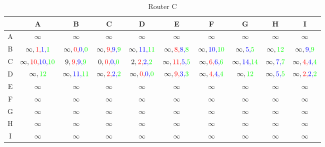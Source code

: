 \documentclass[a4paper,10pt]{article}
\begin{document}
\begin{table}[H]
\centering
\begin{tabular}{|c|c|c|c|c|c|c|c|c|c|} \hline
 & A & B & C & D & E & F & G & H & I  \\\hline
A & $ \infty $ & $\infty $ & $\infty $ & $\infty $ & $\infty $ & $\infty $ & $\infty $ & $ \infty$ & $\infty $ \\\hline
B & $\infty,{\color{red}1,}{\color{blue}1,}{\color{green}1}$ & $\infty,{\color{red}0,}{\color{blue}0,}{\color{green}0} $ & $\infty,{\color{red}9,}{\color{blue}9,}{\color{green}9} $ & $ \infty,{\color{blue}11,}{\color{green}11}$ & $\infty,{\color{red}8,}{\color{blue}8,}{\color{green}8} $ & $ \infty,{\color{blue}10,}{\color{green}10}$ & $\infty,{\color{blue}5,}{\color{green}5} $ & $ \infty,{\color{green}12}$ & $\infty,{\color{blue}9,}{\color{green}9} $  \\\hline
C & $ \infty,{\color{red}10,}{\color{blue}10,}{\color{green}10}$ & $9,{\color{red}9,}{\color{blue}9,}{\color{green}9} $ & $0,{\color{red}0,}{\color{blue}0,}{\color{green}0} $ & $2,{\color{red}2,}{\color{blue}2,}{\color{green}2} $ & $ \infty,{\color{red}11,}{\color{blue}5,}{\color{green}5}$ & $\infty,{\color{red}6,}{\color{blue}6,}{\color{green}6} $ & $\infty,{\color{blue}14,}{\color{green}14} $ & $\infty,{\color{blue}7,}{\color{green}7} $ & $ \infty,{\color{red}4,}{\color{blue}4,}{\color{green}4}$ \\\hline
D & $ \infty,{\color{green}12}$ & $\infty,{\color{blue}11,}{\color{green}11} $ & $\infty,{\color{red}2,}{\color{blue}2,}{\color{green}2} $ & $\infty,{\color{red}0,}{\color{blue}0,}{\color{green}0} $ & $\infty,{\color{red}9,}{\color{blue}3,}{\color{green}3} $ & $\infty,{\color{red}4,}{\color{blue}4,}{\color{green}4} $ & $ \infty,{\color{green}12}$ & $\infty,{\color{blue}5,}{\color{green}5} $ & $\infty,{\color{red}2,}{\color{blue}2,}{\color{green}2} $ \\\hline
E & $ \infty$ & $\infty $ & $\infty $ & $\infty $ & $\infty $ & $\infty $ & $ \infty$ & $\infty $ & $\infty $ \\\hline
F & $ \infty$ & $\infty $ & $\infty $ & $\infty $ & $\infty $ & $\infty $ & $ \infty$ & $\infty $ & $\infty $ \\\hline
G & $ \infty$ & $\infty $ & $\infty $ & $\infty $ & $\infty $ & $\infty $ & $ \infty$ & $\infty $ & $\infty $ \\\hline
H & $ \infty$ & $\infty $ & $\infty $ & $\infty $ & $\infty $ & $\infty $ & $ \infty$ & $\infty $ & $\infty $ \\\hline
I & $ \infty$ & $\infty $ & $ \infty$ & $\infty $ & $ \infty$ & $\infty $ & $ \infty$ & $ \infty$ & $ \infty$ \\\hline
\end{tabular}
\caption{Router C}
\end{table} \\
\end{document}
